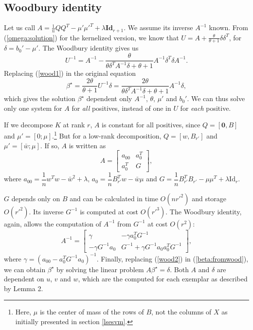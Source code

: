 \subsection{Woodbury identity}
Let us call $A=\frac{1}{n}QQ^T-\mu'\mu'^T+\lambda\textbf{Id}_{r+1}$. We assume its inverse $A^{-1}$ known. From (\ref{omega:solution}) for the kernelized version, we know that $U=A+\frac{\theta}{\theta+1}\delta\delta^T$, for $\delta=b_0'-\mu'$. The Woodbury identity gives us 
\begin{equation}
U^{-1}=A^{-1} -\dfrac{\theta}{\theta\delta^TA^{-1}\delta+ \theta+1}A^{-1}\delta^T\delta A^{-1}.\label{wood1}
\end{equation}
Replacing (\ref{wood1}) in the original equation 
\begin{equation}
\beta^\star = \dfrac{2\theta}{\theta+1}U^{-1}\delta = \dfrac{2\theta}{\theta\delta^TA^{-1}\delta+ \theta+1}A^{-1}\delta,\label{beta:fromwood}
\end{equation}
which gives the solution $\beta^\star$ dependent only $A^{-1}$, $\theta$, $\mu'$ and $b_0'$. 
We can thus solve only one system for $A$ for \textit{all} positives, instead of one in $U$ for \textit{each} positive.

If we decompose $K$ at rank $r$, $A$ is constant for all positives, since $Q = [\textbf{0}, B]$ and $\mu'=[0; \mu]$.\footnote{Here, $\mu$ is the center of mass of the rows of $B$, not the columns of $X$ as initially presented in section \ref{lsesvm}.} 
But for a low-rank decomposition, $Q=[w, B_{r'}]$ and $\mu' = [\bar{w}; \mu]$. If so, $A$ is written as 
\begin{equation}
A = \begin{bmatrix}
a_{00} & a_0^T\\
a_0^T & G
\end{bmatrix},
\end{equation}
where $a_{00}=\dfrac{1}{n}w^Tw-\bar{w}^2+\lambda$, $a_0 = \dfrac{1}{n}B_{r'}^Tw-\bar{w}\mu$ and $G=\dfrac{1}{n}B_{r'}^TB_{r'}-\mu\mu^T+\lambda\text{Id}_r$.

$G$ depends only on $B$ and can be calculated in time $O(nr'^2)$ and storage $O(r'^2)$. 
Its inverse $G^{-1}$ is computed at cost $O(r'^3)$.
The Woodbury identity, again, allows the computation of $A^{-1}$ from $G^{-1}$ at cost $O(r^2)$:
\begin{equation}
A^{-1} = \begin{bmatrix}\gamma & -\gamma a_0^TG^{-1}\\ -\gamma G^{-1}a_0 & G^{-1}+\gamma G^{-1}a_0a_0^TG^{-1}\end{bmatrix},\label{wood2}
\end{equation}
where $\gamma = \left(a_{00}-a_0^TG^{-1}a_0\right)^{-1}$. Finally, replacing (\ref{wood2}) in (\ref{beta:fromwood}), we can obtain $\beta^\star$ by solving the linear problem $A\beta^\star = \delta$. 
Both $A$ and $\delta$ are dependent on $u$, $v$ and $w$, which are the computed for each exemplar as described by Lemma 2.